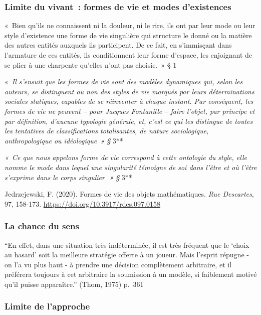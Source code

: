 \documentclass[
  a4paper,
  DIV=11,
  numbers=noendperiod]{scrreprt}
\begin{document}
\subsubsection{Limite du vivant~: formes de vie et modes
d'existences}\label{limite-du-vivant-formes-de-vie-et-modes-dexistences}

«~Bien qu'ils ne connaissent ni la douleur, ni le rire, ils ont par leur
mode ou leur style d'existence une forme de vie singulière qui structure
le donné ou la matière des autres entités auxquels ils participent. De
ce fait, en s'immisçant dans l'armature de ces entités, ils
conditionnent leur forme d'espace, les enjoignant de se plier à une
charpente qu'elles n'ont pas choisie.~» § 1

«~\emph{Il s'ensuit que les formes de vie sont des modèles dynamiques
qui, selon les auteurs, se distinguent ou non des styles de vie marqués
par leurs déterminations sociales statiques, capables de se réinventer à
chaque instant. Par conséquent, les formes de vie ne peuvent -- pour
Jacques Fontanille -- faire l'objet, par principe et par définition,
d'aucune typologie générale, et, c'est ce qui les distingue de toutes
les tentatives de classifications totalisantes, de nature sociologique,
anthropologique ou idéologique~» §} 3**

\emph{«~Ce que nous appelons forme de vie correspond à cette ontologie
du style, elle nomme le mode dans lequel une singularité témoigne de soi
dans l'être et où l'être s'exprime dans le corps singulier\,~» §} 3**

Jedrzejewski, F. (2020). Formes de vie des objets mathématiques.
\emph{Rue Descartes}, 97, 158-173.
\url{https://doi.org/10.3917/rdes.097.0158}

\subsubsection{La chance du sens}\label{la-chance-du-sens}

``En effet, dans une situation très indéterminée, il est très fréquent
que le `choix au hasard' soit la meilleure stratégie offerte à un
joueur. Mais l'esprit répugne - on l'a vu plus haut - à prendre une
décision complètement arbitraire, et il préférera toujours à cet
arbitraire la soumission à un modèle, si faiblement motivé qu'il puisse
apparaître.'' (Thom, 1975) p.~361

\subsubsection{Limite de l'approche}\label{limite-de-lapproche}
\end{document}
